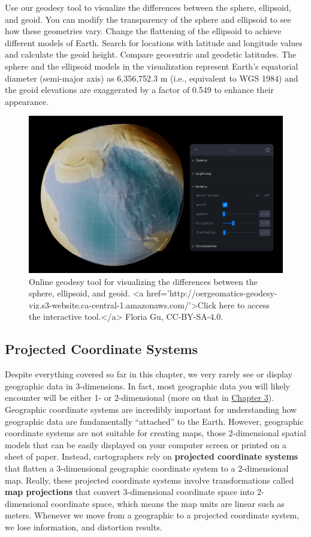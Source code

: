 \documentclass[
]{book}
\begin{document}
Use our geodesy tool to visualize the differences between the sphere, ellipsoid, and geoid. You can modify the transparency of the sphere and ellipsoid to see how these geometries vary. Change the flattening of the ellipsoid to achieve different models of Earth. Search for locations with latitude and longitude values and calculate the geoid height. Compare geocentric and geodetic latitudes. The sphere and the ellipsoid models in the visualization represent Earth's equatorial diameter (semi-major axis) as 6,356,752.3 m (i.e., equivalent to WGS 1984) and the geoid elevations are exaggerated by a factor of 0.549 to enhance their appearance.

\begin{figure}
\includegraphics[width=0.75\linewidth]{images/02-geodesy-visualization-static} \caption{Online geodesy tool for visualizing the differences between the sphere, ellipsoid, and geoid. <a href='http://oergeomatics-geodesy-viz.s3-website.ca-central-1.amazonaws.com/'>Click here to access the interactive tool.</a> Floria Gu, CC-BY-SA-4.0.}\label{fig:2-geodesy-visualization-static}
\end{figure}

\hypertarget{projected-coordinate-systems}{%
\subsection{Projected Coordinate Systems}\label{projected-coordinate-systems}}

Despite everything covered so far in this chapter, we very rarely see or display geographic data in 3-dimensions. In fact, most geographic data you will likely encounter will be either 1- or 2-dimensional (more on that in \href{https://ubc-geomatics-textbook.github.io/geomatics-textbook/types-of-data.html}{Chapter 3}). Geographic coordinate systems are incredibly important for understanding how geographic data are fundamentally ``attached'' to the Earth. However, geographic coordinate systems are not suitable for creating maps, those 2-dimensional spatial models that can be easily displayed on your computer screen or printed on a sheet of paper. Instead, cartographers rely on \textbf{projected coordinate systems} that flatten a 3-dimensional geographic coordinate system to a 2-dimensional map. Really, these projected coordinate systems involve transformations called \textbf{map projections} that convert 3-dimensional coordinate space into 2-dimensional coordinate space, which means the map units are linear such as meters. Whenever we move from a geographic to a projected coordinate system, we lose information, and distortion results.
\end{document}
